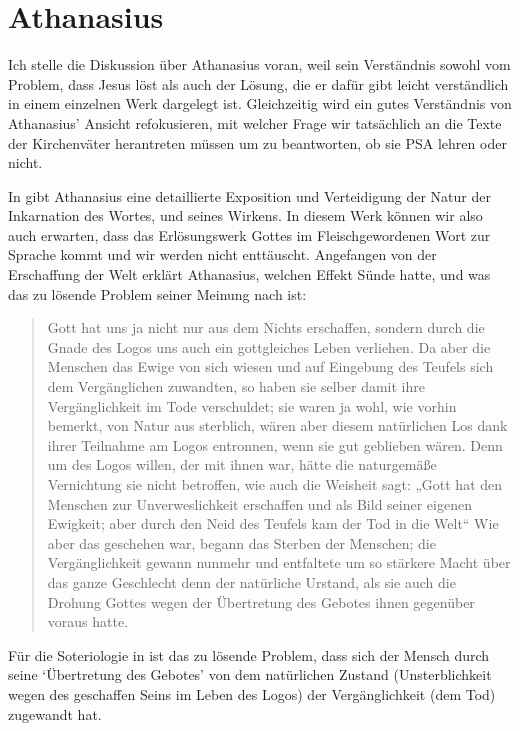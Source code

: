 \section{Athanasius}
Ich stelle die Diskussion über Athanasius voran, weil sein Verständnis sowohl vom Problem, dass Jesus löst als auch der Lösung, die er dafür gibt leicht verständlich in einem einzelnen Werk dargelegt ist.
Gleichzeitig wird ein gutes Verständnis von Athanasius' Ansicht refokusieren, mit welcher Frage wir tatsächlich an die Texte der Kirchenväter herantreten müssen um zu beantworten, ob sie PSA lehren oder nicht.

In \Cite{de-incarnatione-verbi} gibt Athanasius eine detaillierte Exposition und Verteidigung der Natur der Inkarnation des Wortes, und seines Wirkens.
In diesem Werk können wir also auch erwarten, dass das Erlösungswerk Gottes im Fleischgewordenen Wort zur Sprache kommt und wir werden nicht enttäuscht.
Angefangen von der Erschaffung der Welt erklärt Athanasius, welchen Effekt Sünde hatte, und was das zu lösende Problem seiner Meinung nach ist:

\begin{quote}
Gott hat uns ja nicht nur aus dem Nichts erschaffen, sondern durch die Gnade des Logos
uns auch ein gottgleiches Leben verliehen.
Da aber die Menschen das Ewige von sich wiesen und auf Eingebung des Teufels sich dem Vergänglichen zuwandten, so haben sie selber
damit ihre Vergänglichkeit im Tode verschuldet; sie waren ja wohl, wie vorhin bemerkt,
von Natur aus sterblich, wären aber diesem natürlichen Los dank ihrer Teilnahme am Logos entronnen, wenn sie gut geblieben wären.
Denn um des Logos willen, der mit ihnen
war, hätte die naturgemäße Vernichtung sie nicht betroffen, wie auch die Weisheit sagt:
„Gott hat den Menschen zur Unverweslichkeit erschaffen und als Bild seiner eigenen Ewigkeit;
aber durch den Neid des Teufels kam der Tod in die Welt“
Wie aber das geschehen war, begann das Sterben der Menschen;
die Vergänglichkeit gewann nunmehr und entfaltete um so stärkere Macht über das ganze Geschlecht denn der natürliche Urstand, als
sie auch die Drohung Gottes wegen der Übertretung des Gebotes ihnen gegenüber voraus hatte.
\end{quote}

Für die Soteriologie in \Cite{de-incarnatione-verbi} ist das zu lösende Problem,
dass sich der Mensch durch seine `Übertretung des Gebotes' von dem natürlichen Zustand
(Unsterblichkeit wegen des geschaffen Seins im Leben des Logos) der Vergänglichkeit (dem Tod) zugewandt hat.

